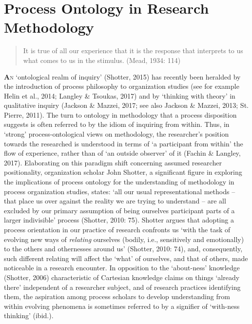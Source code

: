 
\chapter{Process Ontology in Research Methodology}
    \blockquote{It is true of all our experience that it is the response that interprets to us what comes to us in the stimulus. (Mead, 1934: 114)}
\lettrine[lines=2]{\bfseries\color{black}A}{n} ‘ontological realm of inquiry’ (Shotter, 2015) has recently been heralded by the introduction of process philosophy to organization studies (see for example Helin et al., 2014; Langley \& Tsoukas, 2017) and by ‘thinking with theory’ in qualitative inquiry (Jackson \& Mazzei, 2017; see also Jackson \& Mazzei, 2013; St. Pierre, 2011). The turn to ontology in methodology that a process disposition suggests is often referred to by the idiom of inquiring from within. Thus, in ‘strong’ process-ontological views on methodology, the researcher’s position towards the researched is understood in terms of ‘a participant from within’ the flow of experience, rather than of ‘an outside observer’ of it (Fachin \& Langley, 2017). Elaborating on this paradigm shift concerning assumed researcher positionality, organization scholar John Shotter, a significant figure in exploring the implications of process ontology for the understanding of methodology in process organization studies, states: ‘all our usual representational methods – that place us over against the reality we are trying to understand – are all excluded by our primary assumption of being ourselves participant parts of a larger indivisible’ process (Shotter, 2010: 75). Shotter argues that adopting a process orientation in our practice of research confronts us ‘with the task of evolving new ways of \textit{relating} ourselves (bodily, i.e., sensitively and emotionally) to the others and othernesses around us’ (Shotter, 2010: 74), and, consequently, such different relating will affect the ‘what’ of ourselves, and that of others, made noticeable in a research encounter. In opposition to the ‘about-ness’ knowledge (Shotter, 2006) characteristic of Cartesian knowledge claims on things ‘already there’ independent of a researcher subject, and of research practices identifying them, the aspiration among process scholars to develop understanding from within evolving phenomena is sometimes referred to by a signifier of ‘with-ness thinking’ (ibid.). 

